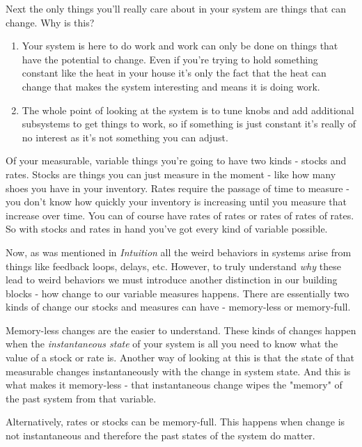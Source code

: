 \documentclass[11pt,a5paper]{book}
\begin{document}
Next the only things you'll really care about in your system are things that can change. Why is this?

\begin{enumerate}
\item Your system is here to do work and work can only be done on things that have the potential to change. Even if you're trying to hold something constant like the heat in your house it's only the fact that the heat can change that makes the system interesting and means it is doing work.
\item The whole point of looking at the system is to tune knobs and add additional subsystems to get things to work, so if something is just constant it's really of no interest as it's not something you can adjust. 
\end{enumerate}

Of your measurable, variable things you're going to have two kinds - stocks and rates. Stocks are things you can just measure in the moment - like how many shoes you have in your inventory. Rates require the passage of time to measure - you don't know how quickly your inventory is increasing until you measure that increase over time. You can of course have rates of rates or rates of rates of rates. So with stocks and rates in hand you've got every kind of variable possible.
\newline

Now, as was mentioned in \textit{Intuition} all the weird behaviors in systems arise from things like feedback loops, delays, etc. However, to truly understand \textit{why} these lead to weird behaviors we must introduce another distinction in our building blocks - how change to our variable measures happens. There are essentially two kinds of change our stocks and measures can have - memory-less or memory-full. 
\newline

Memory-less changes are the easier to understand. These kinds of changes happen when the \textit{instantaneous state} of your system is all you need to know what the value of a stock or rate is. Another way of looking at this is that the state of that measurable changes instantaneously with the change in system state. And this is what makes it memory-less - that instantaneous change wipes the "memory" of the past system from that variable.
\newline

Alternatively, rates or stocks can be memory-full. This happens when change is not instantaneous and therefore the past states of the system do matter. 
\newline
\end{document}
